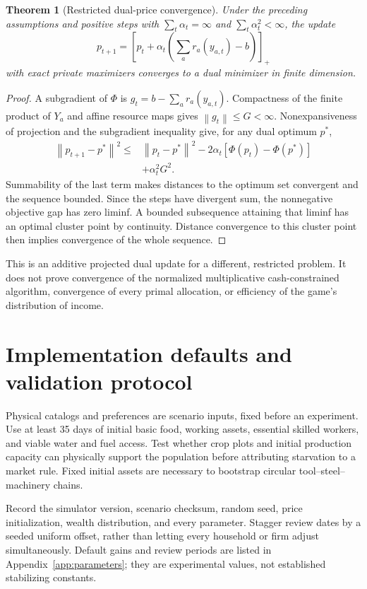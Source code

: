 \documentclass[10pt,a4paper,twocolumn]{article}
\newtheorem{theorem}{Theorem}
\newcommand{\norm}[1]{\left\|#1\right\|}
\begin{document}
\begin{theorem}[Restricted dual-price convergence]
Under the preceding assumptions and
positive steps with $\sum_t\alpha_t=\infty$ and
$\sum_t\alpha_t^2<\infty$, the update
\begin{equation}
 p_{t+1}=\left[p_t+\alpha_t
 \left(\sum_a r_a(y_{a,t})-b\right)\right]_+
 \label{eq:dualupdate}
\end{equation}
with exact private maximizers converges to a dual minimizer in finite
dimension.
\end{theorem}
\begin{proof}
A subgradient of $\Phi$ is $g_t=b-\sum_a r_a(y_{a,t})$.
Compactness of the finite product of $Y_a$ and affine resource maps gives
$\norm{g_t}\leq G<\infty$.
Nonexpansiveness of projection and the subgradient inequality give, for
any dual optimum $p^*$,
\begin{align}
 \norm{p_{t+1}-p^*}^2\leq{}&\norm{p_t-p^*}^2
 -2\alpha_t[\Phi(p_t)-\Phi(p^*)]\nonumber\\
 &+\alpha_t^2G^2.
\end{align}
Summability of the last term makes distances to the optimum set
convergent and the sequence bounded. Since the steps have divergent
sum, the nonnegative objective gap has zero liminf. A bounded
subsequence attaining that liminf has an optimal cluster point by
continuity. Distance convergence to this cluster point then implies
convergence of the whole sequence.
\end{proof}
This is an additive projected dual update for a different, restricted
problem. It does not prove convergence of the normalized multiplicative
cash-constrained algorithm, convergence of every primal allocation, or
efficiency of the game's distribution of income.

\section{Implementation defaults and validation protocol}
Physical catalogs and preferences are scenario inputs, fixed before an
experiment. Use at least 35 days of initial basic food, working assets,
essential skilled workers, and viable water and fuel access. Test whether
crop plots and initial production capacity can physically support the
population before attributing starvation to a market rule. Fixed initial
assets are necessary to bootstrap circular tool--steel--machinery chains.

Record the simulator version, scenario checksum, random seed, price
initialization, wealth distribution, and every parameter. Stagger review
dates by a seeded uniform offset, rather than letting every household or
firm adjust simultaneously. Default gains and review periods are listed
in Appendix~\ref{app:parameters}; they are experimental values, not
established stabilizing constants.
\end{document}
